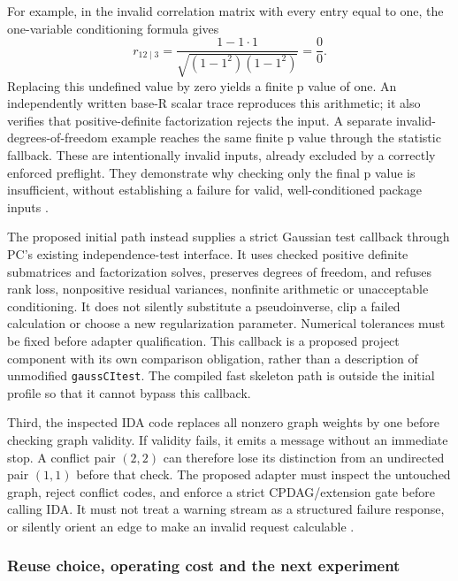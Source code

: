 For example, in the invalid correlation matrix with every entry equal to
one, the one-variable conditioning formula gives \[
 r_{12\mid3}
   =\frac{1-1\cdot1}{\sqrt{(1-1^2)(1-1^2)}}=\frac00.
\] Replacing this undefined value by zero yields a finite p value of
one. An independently written base-R scalar trace reproduces this
arithmetic; it also verifies that positive-definite factorization
rejects the input. A separate invalid-degrees-of-freedom example reaches
the same finite p value through the statistic fallback. These are
intentionally invalid inputs, already excluded by a correctly enforced
preflight. They demonstrate why checking only the final p value is
insufficient, without establishing a failure for valid, well-conditioned
package inputs \citep{exec13_pcalg_reuse_examples}.

The proposed initial path instead supplies a strict Gaussian test
callback through PC's existing independence-test interface. It uses
checked positive definite submatrices and factorization solves,
preserves degrees of freedom, and refuses rank loss, nonpositive
residual variances, nonfinite arithmetic or unacceptable conditioning.
It does not silently substitute a pseudoinverse, clip a failed
calculation or choose a new regularization parameter. Numerical
tolerances must be fixed before adapter qualification. This callback is
a proposed project component with its own comparison obligation, rather
than a description of unmodified \texttt{gaussCItest}. The compiled fast
skeleton path is outside the initial profile so that it cannot bypass
this callback.

Third, the inspected IDA code replaces all nonzero graph weights by one
before checking graph validity. If validity fails, it emits a message
without an immediate stop. A conflict pair \((2,2)\) can therefore lose
its distinction from an undirected pair \((1,1)\) before that check. The
proposed adapter must inspect the untouched graph, reject conflict
codes, and enforce a strict CPDAG/extension gate before calling IDA. It
must not treat a warning stream as a structured failure response, or
silently orient an edge to make an invalid request calculable
\citep{exec13_pcalg_reuse_primary}.

\hypertarget{reuse-choice-operating-cost-and-the-next-experiment}{%
\subsubsection{Reuse choice, operating cost and the next
experiment}\label{reuse-choice-operating-cost-and-the-next-experiment}}

